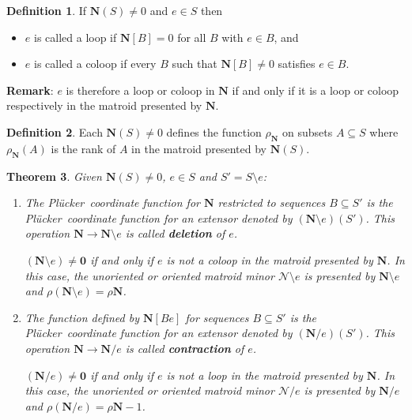\documentclass[12pt]{article}
\newtheorem{theorem}{Theorem}[section]
\theoremstyle{definition}
\newtheorem{definition}[theorem]{Definition}
\newcommand{\Remark}{\textbf{Remark}}
\newcommand{\ext}[1]{\ensuremath{\mathbf{#1}}}
\newcommand{\Plucker}{Pl\"{u}cker\ }
\begin{document}
\begin{definition}
If $\ext{N}(S)\neq 0$ and $e\in S$ then
\begin{itemize}
\item
$e$ is called a loop if $\ext{N}[B]=0$ for all $B$ with $e\in B$, and
\item
$e$ is called a coloop if every $B$ such that $\ext{N}[B]\neq 0$ 
satisfies $e\in B$.
\end{itemize}
\end{definition}

\Remark: $e$ is therefore a loop or coloop in $\ext{N}$ if and only if
it is a loop or coloop respectively in the matroid presented by 
$\ext{N}$.

\begin{definition}
Each $\ext{N}(S)\neq 0$ defines the function $\rho_{\ext{N}}$ on
subsets $A\subseteq S$ where $\rho_{\ext{N}}(A)$ is the rank of $A$ in 
the matroid presented by $\ext{N}(S)$.
\end{definition}

\begin{theorem}
\label{ExtMinors}
Given $\ext{N}(S)\neq 0$, $e\in S$ and $S'=S\setminus e$:
\begin{enumerate}
\item The \Plucker coordinate function for $\ext{N}$ restricted to sequences
$B\subseteq S'$ is the \Plucker coordinate function for
an extensor denoted by $(\ext{N}\setminus e)(S')$.  
This operation $\ext{N}\rightarrow\ext{N}\setminus e$ is called \textbf{deletion} of $e$.

$(\ext{N}\setminus e)\neq \ext{0}$ if and only if 
$e$ is not a coloop in the matroid presented by $\ext{N}$.
In this case,
the unoriented or oriented matroid minor $\mathcal{N}\setminus e$ 
is presented by $\ext{N}\setminus e$ and
$\rho(\ext{N}\setminus e) = \rho\ext{N}$.  

\item The function defined by $\ext{N}[Be]$ 
for sequences $B\subseteq S'$ is the \Plucker coordinate function for
an extensor denoted by $(\ext{N}/e)(S')$.  
This operation $\ext{N}\rightarrow\ext{N}/ e$ is called 
\textbf{contraction} of  $e$.

$(\ext{N}/e)\neq \ext{0}$ if and only if 
$e$ is not a loop in the matroid presented by $\ext{N}$.
In this case,
the unoriented or oriented matroid minor $\mathcal{N}/ e$ 
is presented by $\ext{N}/e$ and
$\rho(\ext{N}/ e) = \rho\ext{N}-1$.  

\end{enumerate}
\end{theorem}
\end{document}
